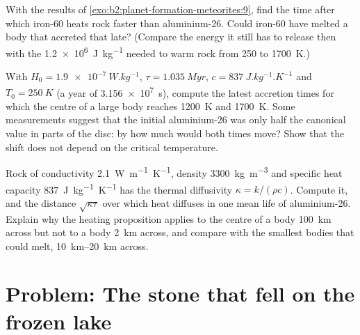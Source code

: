 \begin{exercise}[$\star\star\star$]\label{exo:b2:planet-formation-meteorites:10}
With the results of \cref{exo:b2:planet-formation-meteorites:9}, find the time after which iron-60 heats rock
faster than aluminium-26. Could iron-60 have melted a body that accreted that
late? (Compare the energy it still has to release then with the
\qty{1.2e6}{J.kg^{-1}} needed to warm rock from \num{250} to \qty{1700}{K}.)
\end{exercise}

\begin{exercise}[$\star\star\star$]\label{exo:b2:planet-formation-meteorites:11}
With $H_0 = \qty{1.9e-7}{W.kg^{-1}}$, $\tau = \qty{1.035}{Myr}$,
$c = \qty{837}{J.kg^{-1}.K^{-1}}$ and $T_0 = \qty{250}{K}$ (a year of
\qty{3.156e7}{s}), compute the latest accretion times for which the centre of a
large body reaches \qty{1200}{K} and \qty{1700}{K}. Some measurements suggest that
the initial aluminium-26 was only half the canonical value in parts of the disc:
by how much would both times move? Show that the shift does not depend on the
critical temperature.
\end{exercise}

\begin{exercise}[$\star\star\star$]\label{exo:b2:planet-formation-meteorites:12}
Rock of conductivity \qty{2.1}{W.m^{-1}.K^{-1}}, density
\qty{3300}{kg.m^{-3}} and specific heat capacity \qty{837}{J.kg^{-1}.K^{-1}} has
the thermal diffusivity $\kappa = k/(\rho c)$. Compute it, and the distance
$\sqrt{\kappa\tau}$ over which heat diffuses in one mean life of aluminium-26.
Explain why the heating proposition applies to the centre of a body
\qty{100}{km} across but not to a body \qty{2}{km} across, and compare with the
smallest bodies that could melt, \qtyrange{10}{20}{km} across.
\end{exercise}

\section{Problem: The stone that fell on the frozen lake}

